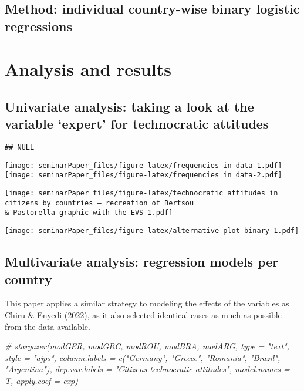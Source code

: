 \documentclass[
  12pt,
  english,
]{article}
\newenvironment{Shaded}{\begin{snugshade}}{\end{snugshade}}
\newcommand{\CommentTok}[1]{\textcolor[rgb]{0.56,0.35,0.01}{\textit{#1}}}
\begin{document}
\hypertarget{method-individual-country-wise-binary-logistic-regressions}{%
\subsection{Method: individual country-wise binary logistic
regressions}\label{method-individual-country-wise-binary-logistic-regressions}}

\hypertarget{analysis-and-results}{%
\section{Analysis and results}\label{analysis-and-results}}

\hypertarget{univariate-analysis-taking-a-look-at-the-variable-expert-for-technocratic-attitudes}{%
\subsection{Univariate analysis: taking a look at the variable `expert'
for technocratic
attitudes}\label{univariate-analysis-taking-a-look-at-the-variable-expert-for-technocratic-attitudes}}

\begin{verbatim}
## NULL
\end{verbatim}

\texttt{[image: seminarPaper\_files/figure-latex/frequencies in data-1.pdf]}
\texttt{[image: seminarPaper\_files/figure-latex/frequencies in data-2.pdf]}

\texttt{[image: seminarPaper\_files/figure-latex/technocratic attitudes in citizens by countries --- recreation of Bertsou \\\& Pastorella graphic with the EVS-1.pdf]}

\texttt{[image: seminarPaper\_files/figure-latex/alternative plot binary-1.pdf]}

\hypertarget{multivariate-analysis-regression-models-per-country}{%
\subsection{Multivariate analysis: regression models per
country}\label{multivariate-analysis-regression-models-per-country}}

This paper applies a similar strategy to modeling the effects of the
variables as \protect\hyperlink{ref-chiru2022wants}{Chiru \& Enyedi}
(\protect\hyperlink{ref-chiru2022wants}{2022}), as it also selected
identical cases as much as possible from the data available.

\begin{Shaded}
\begin{Highlighting}[]
\CommentTok{\# stargazer(modGER, modGRC, modROU, modBRA, modARG, type = "text", style = "ajps", column.labels = c("Germany", "Greece", "Romania", "Brazil", "Argentina"), dep.var.labels = "Citizens\textquotesingle{} technocratic attitudes", model.names = T, apply.coef = exp)}
\end{Highlighting}
\end{Shaded}
\end{document}
